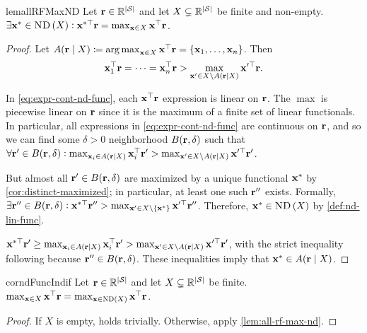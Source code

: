 \begin{restatable}{lem}{allRFMaxND}\label{lem:all-rf-max-nd}
Let $\mathbf{r} \in \mathbb{R}^{\left|\mathcal{S}\right|}$ and let $X\subsetneq \mathbb{R}^{\left|\mathcal{S}\right|}$ be finite and non-empty. $\exists \mathbf{x}^* \in \text{\upshape\textsc{ND}}\left(X\right): \mathbf{x}^{*\top}\mathbf{r}=\max_{\mathbf{x} \in X} \mathbf{x}^\top \mathbf{r}$.
\end{restatable}
\begin{proof}
Let $A(\mathbf{r}\mid X)\coloneqq \operatorname*{arg\,max}_{\mathbf{x}\in X} \mathbf{x}^\top \mathbf{r}=\left\{\mathbf{x}_1,\ldots, \mathbf{x}_n\right\}$. Then 
\begin{align}
    \mathbf{x}_1^\top \mathbf{r} = \cdots= \mathbf{x}_n^\top \mathbf{r}> \max_{\mathbf{x}' \in X \setminus A(\mathbf{r}\mid X)} \mathbf{x}'^\top \mathbf{r}.\label{eq:expr-cont-nd-func}
\end{align}

In \cref{eq:expr-cont-nd-func}, each $\mathbf{x}^\top \mathbf{r}$ expression is linear on $\mathbf{r}$. The $\max$ is piecewise linear on $\mathbf{r}$ since it is the maximum of a finite set of linear functionals. In particular, all expressions in \cref{eq:expr-cont-nd-func} are continuous on $\mathbf{r}$, and so we can find some $\delta>0$ neighborhood $B(\mathbf{r},\delta)$ such that $\forall \mathbf{r}' \in B(\mathbf{r},\delta): \max_{\mathbf{x}_i\in A(\mathbf{r}\mid X)} \mathbf{x}_i^\top \mathbf{r}' > \max_{\mathbf{x}'\in X\setminus A(\mathbf{r}\mid X)} \mathbf{x}'^\top \mathbf{r}'$.

But almost all $\mathbf{r}' \in B(\mathbf{r},\delta)$ are maximized by a unique functional $\mathbf{x}^*$ by \cref{cor:distinct-maximized}; in particular, at least one such $\mathbf{r}''$ exists. Formally, $\exists \mathbf{r}''\in B(\mathbf{r},\delta):\mathbf{x}^{*\top} \mathbf{r}''>\max_{\mathbf{x}' \in X\setminus \left\{\mathbf{x}^*\right\}} \mathbf{x}'^\top \mathbf{r}''$. Therefore, $\mathbf{x}^*\in \text{\upshape\textsc{ND}}\left(X\right)$ by \cref{def:nd-lin-func}. 

$\mathbf{x}^{*\top} \mathbf{r}'\geq\max_{\mathbf{x}_i\in A(\mathbf{r}\mid X)} \mathbf{x}_i^\top \mathbf{r}' > \max_{\mathbf{x}'\in X\setminus A(\mathbf{r}\mid X)} \mathbf{x}'^\top \mathbf{r}'$, with the strict inequality following because  $\mathbf{r}'' \in B(\mathbf{r},\delta)$. These inequalities imply that $\mathbf{x}^*\in A(\mathbf{r}\mid X)$.
\end{proof}

\begin{restatable}{cor}{ndFuncIndif}\label{cor:nd-func-indif}
Let $\mathbf{r} \in \mathbb{R}^{\left|\mathcal{S}\right|}$ and let $X\subsetneq \mathbb{R}^{\left|\mathcal{S}\right|}$ be finite. $\max_{\mathbf{x}\in X} \mathbf{x}^\top \mathbf{r}=\max_{\mathbf{x}\in \text{\upshape\textsc{ND}}\left(X\right)} \mathbf{x}^\top \mathbf{r}$. 
\end{restatable}
\begin{proof}
If $X$ is empty, holds trivially. Otherwise, apply \cref{lem:all-rf-max-nd}.
\end{proof}

